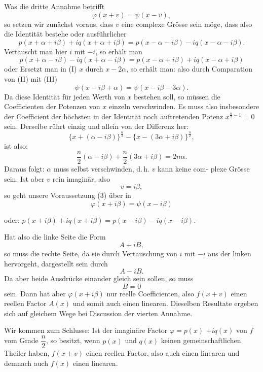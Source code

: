 Was die dritte Annahme betrifft
\[ \varphi(x+v) = \psi(x-v), \]
so setzen wir zunächst voraus, dass $v$ eine complexe Grösse sein
möge, dass also die Identität bestehe
oder ausführlicher
\[ p(x+\alpha+i\beta) + iq(x+\alpha+i\beta) = p(x-\alpha-i\beta) - iq(x-\alpha-i\beta). \]
Vertauscht man hier $i$ mit $-i$, so erhält man
\[ p(x+\alpha-i\beta) - iq(x+\alpha-i\beta) = p(x-\alpha+i\beta) + iq(x-\alpha+i\beta) \]
oder
Ersetzt man in (I) $x$ durch $x-2\alpha$, so erhält man:
also durch Comparation von (II) mit (III)
\[ \psi(x-i\beta+\alpha) = \psi(x-i\beta-3\alpha). \]
Da diese Identität für jeden Werth von $x$ bestehen soll, so müssen
die Coefficienten der Potenzen von $x$ einzeln verschwinden. Es muss
also insbesondere der Coefficient der höchsten in der Identität noch
auftretenden Potenz $x^{\frac{n}{2}-1} = 0$ sein. Derselbe rührt einzig und allein
von der Differenz her:
\[ \{x + (\alpha - i\beta)\}^{\frac{n}{2}} - \{x - (3\alpha + i\beta)\}^{\frac{n}{2}}, \]
ist also:
\[ \frac{n}{2}(\alpha - i\beta) + \frac{n}{2}(3\alpha + i\beta) = 2n\alpha. \]
Daraus folgt: $\alpha$ muss selbst verschwinden, d.\,h. $v$ kann keine com-
plexe Grösse sein. Ist aber $v$ rein imaginär, also
\[ v = i\beta, \]
so geht unsere Voraussetzung (3) über in
\[ \varphi(x+i\beta) = \psi(x-i\beta) \]



oder: \quad $p(x+i\beta) + iq(x+i\beta) = p(x-i\beta) - iq(x-i\beta).$

Hat also die linke Seite die Form
\[ A + iB, \]
so muss die rechte Seite, da sie durch Vertauschung von $i$ mit $-i$
aus der linken hervorgeht, dargestellt sein durch
\[ A - iB. \]
Da aber beide Ausdrücke einander gleich sein sollen, so muss
\[ B = 0 \]
sein. Dann hat aber $\varphi(x+i\beta)$ nur reelle Coefficienten, also $f(x+v)$
einen reellen Factor $A(x)$ und somit auch einen linearen. Dieselben
Resultate ergeben sich auf gleichem Wege bei Discussion der vierten
Annahme.

Wir kommen zum Schlusse: Ist der imaginäre Factor $\varphi = p(x)$
$+ iq(x)$ von $f$ vom Grade $\dfrac{n}{2}$, so besitzt, wenn $p(x)$ und $q(x)$ keinen
gemeinschaftlichen Theiler haben, $f(x+v)$ einen reellen Factor, also
auch einen linearen und demnach auch $f(x)$ einen linearen.

